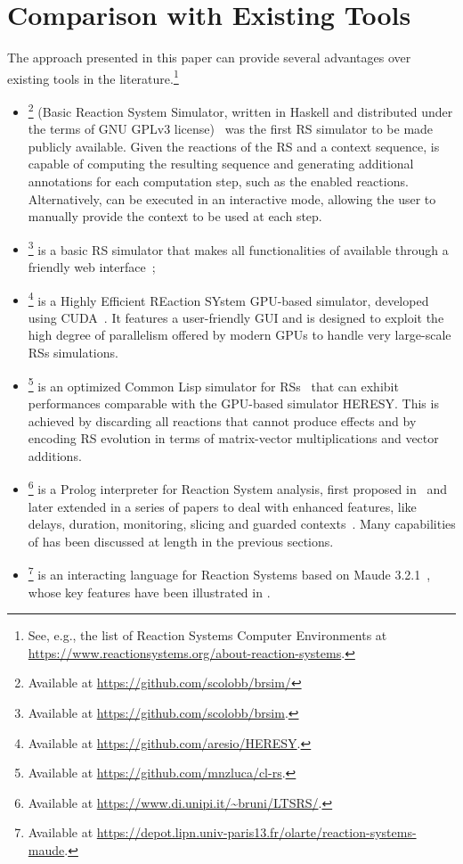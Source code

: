 
\section{Comparison with Existing Tools}\label{sec:related}

The approach presented in this paper can provide several advantages over existing tools in the literature.\footnote{See, e.g., the list of Reaction Systems Computer Environments at \url{https://www.reactionsystems.org/about-reaction-systems}.}
\begin{itemize}
\item
\brsim\footnote{Available at \url{https://github.com/scolobb/brsim/}} (Basic Reaction System Simulator, written in Haskell and distributed under the terms of GNU GPLv3 license)~\cite{DBLP:journals/tcs/AzimiGIP15} was the first RS simulator to be made publicly available. 
Given the reactions of the RS and a context sequence, \brsim is capable of computing the resulting sequence and generating additional annotations for each computation step, such as the enabled reactions.
Alternatively, \brsim can be executed in an interactive mode, allowing the user to manually provide the context to be used at each step.
\item
\WebRSim\footnote{Available at \url{https://github.com/scolobb/brsim}.} is a basic RS simulator that makes all functionalities of  \brsim available through a friendly web interface~\cite{DBLP:conf/birthday/0001RAP18};
\item 
\HERESY\footnote{Available at \url{https://github.com/aresio/HERESY}.} is a Highly Efficient REaction SYstem GPU-based simulator, developed using CUDA~\cite{DBLP:journals/fuin/NobilePSMCMB17}. It features a user-friendly GUI and is designed to exploit the high degree of parallelism offered by modern GPUs to handle very large-scale RSs simulations.
\item
\clrs\footnote{Available at \url{https://github.com/mnzluca/cl-rs}.} is an optimized Common Lisp simulator for RSs~\cite{DBLP:journals/fuin/FerrettiLMP20} that can exhibit performances comparable with the GPU-based simulator \textsf{HERESY}. This is achieved by discarding all reactions that cannot produce effects and by encoding RS evolution in terms of matrix-vector multiplications and vector additions.
\item 
\BioResolve\footnote{Available at \url{https://www.di.unipi.it/~bruni/LTSRS/}.} is a Prolog interpreter for Reaction System analysis, first proposed in~\cite{DBLP:journals/tcs/BrodoBF21} and later extended in a series of papers to deal with enhanced features, like delays, duration, monitoring, slicing and guarded contexts~\cite{DBLP:journals/nca/BrodoBFGLM23,DBLP:journals/nc/BrodoBF24,DBLP:conf/cmsb/BowlesBBFGM24}. Many capabilities of \BioResolve has been discussed at length in the previous sections.
\item
\ccReact\footnote{Available at \url{https://depot.lipn.univ-paris13.fr/olarte/reaction-systems-maude}.} is an interacting language for Reaction Systems based on Maude 3.2.1~\cite{DBLP:conf/cmsb/BallisBFO24}, whose key features have been illustrated in .
\end{itemize}

